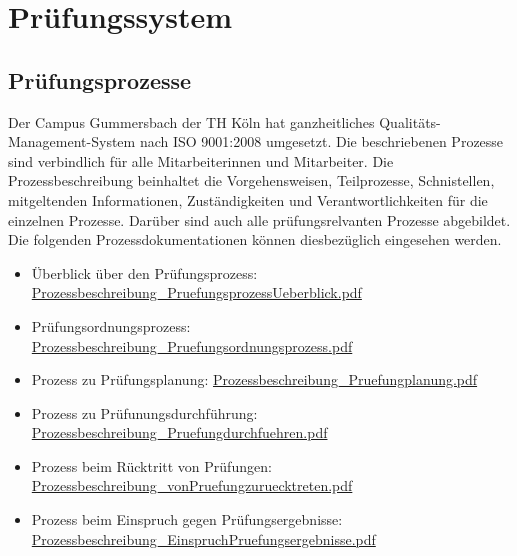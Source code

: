 \chapter{Prüfungssystem}\label{pruxfcfungssystem}

\section{Prüfungsprozesse}\label{pruxfcfungsprozesse}

Der Campus Gummersbach der TH Köln hat ganzheitliches
Qualitäts-Management-System nach ISO 9001:2008 umgesetzt. Die
beschriebenen Prozesse sind verbindlich für alle Mitarbeiterinnen und
Mitarbeiter. Die Prozessbeschreibung beinhaltet die Vorgehensweisen,
Teilprozesse, Schnistellen, mitgeltenden Informationen, Zuständigkeiten
und Verantwortlichkeiten für die einzelnen Prozesse. Darüber sind auch
alle prüfungsrelvanten Prozesse abgebildet. Die folgenden
Prozessdokumentationen können diesbezüglich eingesehen werden.

\begin{itemize}
\tightlist
\item
  Überblick über den Prüfungsprozess:
  \href{https://th-koeln.github.io/mi-2017/anhaenge/Prozessbeschreibung_PruefungsprozessUeberblick.pdf}{Prozessbeschreibung\_PruefungsprozessUeberblick.pdf}
\item
  Prüfungsordnungsprozess:
  \href{https://th-koeln.github.io/mi-2017/anhaenge/Prozessbeschreibung_Pruefungsordnungsprozess.pdf}{Prozessbeschreibung\_Pruefungsordnungsprozess.pdf}
\item
  Prozess zu Prüfungsplanung:
  \href{https://th-koeln.github.io/mi-2017/anhaenge/Prozessbeschreibung_Pruefungplanung.pdf}{Prozessbeschreibung\_Pruefungplanung.pdf}
\item
  Prozess zu Prüfunungsdurchführung:
  \href{https://th-koeln.github.io/mi-2017/anhaenge/Prozessbeschreibung_Pruefungdurchfuehren.pdf}{Prozessbeschreibung\_Pruefungdurchfuehren.pdf}
\item
  Prozess beim Rücktritt von Prüfungen:
  \href{https://th-koeln.github.io/mi-2017/anhaenge/Prozessbeschreibung_vonPruefungzuruecktreten.pdf}{Prozessbeschreibung\_vonPruefungzuruecktreten.pdf}
\item
  Prozess beim Einspruch gegen Prüfungsergebnisse:
  \href{https://th-koeln.github.io/mi-2017/anhaenge/Prozessbeschreibung_EinspruchPruefungsergebnisse.pdf}{Prozessbeschreibung\_EinspruchPruefungsergebnisse.pdf}
\end{itemize}

